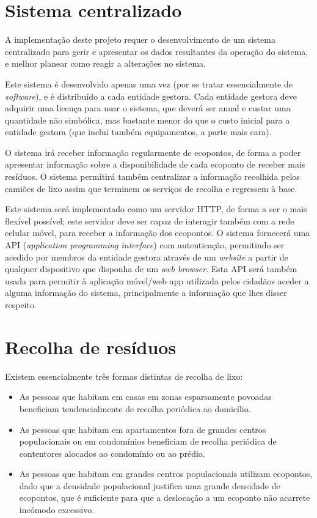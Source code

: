\documentclass[11pt, a4paper, oneside]{book}
\begin{document}
\section{Sistema centralizado}

A implementação deste projeto requer o desenvolvimento de um sistema centralizado para gerir e apresentar os dados resultantes da operação do sistema, e melhor planear como reagir a alterações no sistema.

Este sistema é desenvolvido apenas uma vez (por se tratar essencialmente de \textit{software}), e é distribuído a cada entidade gestora. Cada entidade gestora deve adquirir uma licença para usar o sistema, que deverá ser anual e custar uma quantidade não simbólica, mas bastante menor do que o custo inicial para a entidade gestora (que inclui também equipamentos, a parte mais cara).

O sistema irá receber informação regularmente de ecopontos, de forma a poder apresentar informação sobre a disponibilidade de cada ecoponto de receber mais resíduos. O sistema permitirá também centralizar a informação recolhida pelos camiões de lixo assim que terminem os serviços de recolha e regressem à base.

Este sistema será implementado como um servidor HTTP, de forma a ser o mais flexível possível; este servidor deve ser capaz de interagir também com a rede celular móvel, para receber a informação dos ecopontos. O sistema fornecerá uma API (\textit{application programming interface}) com autenticação, permitindo ser acedido por membros da entidade gestora através de um \textit{website} a partir de qualquer dispositivo que disponha de um \textit{web browser}. Esta API será também usada para permitir à aplicação móvel/web app utilizada pelos cidadãos aceder a alguma informação do sistema, principalmente a informação que lhes disser respeito.

\section{Recolha de resíduos}

Existem essencialmente três formas distintas de recolha de lixo:
\begin{itemize}
    \itemsep0em
    \item As pessoas que habitam em casas em zonas esparsamente povoadas beneficiam tendencialmente de recolha periódica ao domicílio.
    \item As pessoas que habitam em apartamentos fora de grandes centros populacionais ou em condomínios beneficiam de recolha periódica de contentores alocados ao condomínio ou ao prédio.
    \item As pessoas que habitam em grandes centros populacionais utilizam ecopontos, dado que a densidade populacional justifica uma grande densidade de ecopontos, que é suficiente para que a deslocação a um ecoponto não acarrete incómodo excessivo.
\end{itemize}
\end{document}
